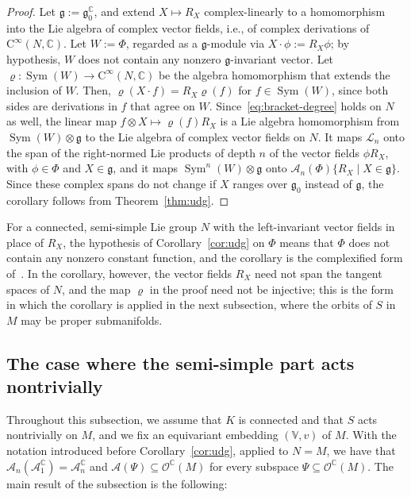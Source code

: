 \documentclass{article}
\newcommand{\C}{\mathbb{C}}
\newcommand{\frakg}{\mathfrak{g}}
\newcommand{\Ocal}{\mathcal{O}}
\newcommand{\cL}{\mathcal{L}}
\newcommand{\Sym}{\operatorname{Sym}}
\theoremstyle{definition}
\theoremstyle{plain}
\begin{document}
\begin{proof}
Let $\frakg:=\frakg_0^\C$, and extend $X\mapsto R_X$ complex-linearly to a homomorphism into the Lie algebra of complex vector fields, i.e.,
    of complex derivations of $\mathrm{C}^\infty(N,\C)$.
Let $W:=\Phi$, regarded as a $\frakg$-module via $X\cdot\phi:=R_X\phi$; by hypothesis, $W$ does not contain any nonzero $\frakg$-invariant vector.
Let $\varrho\colon\Sym(W)\to\mathrm{C}^\infty(N,\C)$ be the algebra homomorphism that extends the inclusion of $W$.
Then, $\varrho(X\cdot f)=R_X\varrho(f)$ for $f\in\Sym(W)$, since both sides are derivations in $f$ that agree on $W$.
Since~\eqref{eq:bracket-degree} holds on $N$ as well, the linear map $f\otimes X\mapsto\varrho(f)R_X$ is a Lie algebra homomorphism from $\Sym(W)\otimes\frakg$ to the Lie algebra of complex vector fields on $N$.
It maps $\cL_n$ onto the span of the right-normed Lie products of depth $n$ of the vector fields $\phi R_X$, with $\phi\in\Phi$ and $X\in\frakg$,
and it maps $\Sym^n(W)\otimes\frakg$ onto $\mathcal A_n(\Phi)\{R_X\mid X\in\frakg\}$.
Since these complex spans do not change if $X$ ranges over $\frakg_0$ instead of $\frakg$, the corollary follows from Theorem~\ref{thm:udg}.
\end{proof}


For a connected, semi-simple Lie group $N$ with the left-invariant vector fields in place of $R_X$, the hypothesis of Corollary~\ref{cor:udg} on $\Phi$ means that $\Phi$ does not contain any nonzero constant function, and the corollary is the complexified form of~\cite[Theorem~1]{CofD3gen}.
In the corollary, however, the vector fields $R_X$ need not span the tangent spaces of $N$, and the map $\varrho$ in the proof need not be injective; this is the form in which the corollary is applied in the next subsection, where the orbits of $S$ in $M$ may be proper submanifolds.



\subsection{The case where the semi-simple part acts nontrivially}\label{ssec:reductive}

Throughout this subsection, we assume that $K$ is connected and that $S$ acts nontrivially on $M$, and we fix an equivariant embedding $(\mathbb V,v)$ of $M$.
With the notation introduced before Corollary~\ref{cor:udg}, applied to $N=M$, we have that $\mathcal A_n(\mathcal A_1^\C)=\mathcal A_n^\C$ and $\mathcal A(\Psi)\subseteq\Ocal^\C(M)$ for every subspace $\Psi\subseteq\Ocal^\C(M)$.
The main result of the subsection is the following:
\end{document}
